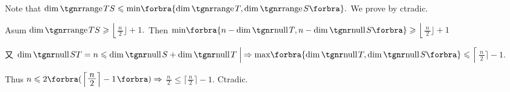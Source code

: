 Note that $\dim\range TS\leqslant\min\!\BigBra{\!\dim\range T,\dim\range S}.$ We prove by ctradic.\par\vspace{1pt}\quad
Asum $\dim\range TS\geqslant \Big\lfloor${\Large$\frac{\,n\,}{2}$}$\Big\rfloor+1.$ \,Then $\min\!\BigBra{n-\dim\null T,n-\dim\null S}\envFontDefault\geqslant \Big\lfloor${\Large$\frac{\,n\,}{2}$}$\Big\rfloor+1$\vspace{1pt}\par\quad
又 $\dim\null ST=n\leqslant\dim\null S+\dim\null T\;\Big|\hspace{-0.7pt}\Rightarrow\max\!\BigBra{\!\dim\null T,\dim\null S}\envFontDefault\leqslant \Big\lceil${\Large$\frac{\,n\,}{2}$}$\Big\rceil-1.$\par\vspace{1pt}\quad
Thus \;$n\leqslant 2\BigBigPar{\Big\lceil${\Large$\frac{\,n\,}{2}$}$\Big\rceil-1}\Rightarrow{}${\Large$\frac{\,n\,}{2}$}${}\leqslant\Big\lceil${\Large$\frac{\,n\,}{2}$}$\Big\rceil-1$. \;Ctradic.\PfEnd\vspace{4pt}\quad
